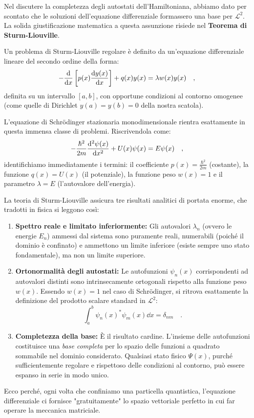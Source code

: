 \begin{approfondimento}[title={Il Teorema di Sturm-Liouville e la Meccanica Quantistica}]
    \noindent
    Nel discutere la completezza degli autostati dell'Hamiltoniana, abbiamo dato per scontato che le soluzioni dell'equazione differenziale formassero una base per $\mathcal{L}^2$. La solida giustificazione matematica a questa assunzione risiede nel \textbf{Teorema di Sturm-Liouville}.

    Un problema di Sturm-Liouville regolare è definito da un'equazione differenziale lineare del secondo ordine della forma:
    \[
        -\dv{x} \left[ p(x) \dv{y(x)}{x} \right] + q(x)y(x) = \lambda w(x) y(x) \quad,
    \]
    definita su un intervallo $[a,b]$, con opportune condizioni al contorno omogenee (come quelle di Dirichlet $y(a)=y(b)=0$ della nostra scatola).
    
    L'equazione di Schrödinger stazionaria monodimensionale rientra esattamente in questa immensa classe di problemi. Riscrivendola come:
    \[
        -\frac{\hbar^2}{2m} \dv[2]{\psi(x)}{x} + U(x)\psi(x) = E \psi(x) \quad,
    \]
    identifichiamo immediatamente i termini: il coefficiente $p(x) = \frac{\hbar^2}{2m}$ (costante), la funzione $q(x) = U(x)$ (il potenziale), la funzione peso $w(x) = 1$ e il parametro $\lambda = E$ (l'autovalore dell'energia).

    La teoria di Sturm-Liouville assicura tre risultati analitici di portata enorme, che tradotti in fisica si leggono così:
    \begin{enumerate}
        \item \textbf{Spettro reale e limitato inferiormente:} Gli autovalori $\lambda_n$ (ovvero le energie $E_n$) ammessi dal sistema sono puramente reali, numerabili (poiché il dominio è confinato) e ammettono un limite inferiore (esiste sempre uno stato fondamentale), ma non un limite superiore.
        \item \textbf{Ortonormalità degli autostati:} Le autofunzioni $\psi_n(x)$ corrispondenti ad autovalori distinti sono intrinsecamente ortogonali rispetto alla funzione peso $w(x)$. Essendo $w(x)=1$ nel caso di Schrödinger, si ritrova esattamente la definizione del prodotto scalare standard in $\mathcal{L}^2$: 
        \[ \int_a^b \psi_n(x)^* \psi_m(x) \dd{x} = \delta_{nm} \quad. \]
        \item \textbf{Completezza della base:} È il risultato cardine. L'insieme delle autofunzioni costituisce una \emph{base completa} per lo spazio delle funzioni a quadrato sommabile nel dominio considerato. Qualsiasi stato fisico $\Psi(x)$, purché sufficientemente regolare e rispettoso delle condizioni al contorno, può essere espanso in serie in modo unico.
    \end{enumerate}
    Ecco perché, ogni volta che confiniamo una particella quantistica, l'equazione differenziale ci fornisce "gratuitamente" lo spazio vettoriale perfetto in cui far operare la meccanica matriciale.
\end{approfondimento}

